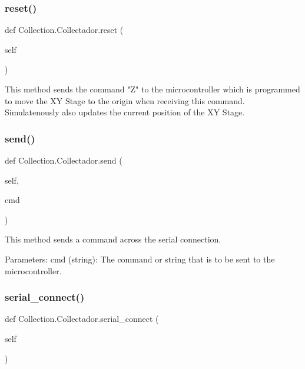 \subsubsection{\texorpdfstring{reset()}{reset()}}
{\footnotesize\ttfamily def Collection.\+Collectador.\+reset (\begin{DoxyParamCaption}\item[{}]{self }\end{DoxyParamCaption})}

\begin{DoxyVerb}This method sends the command "Z" to the microcontroller which is programmed to move the XY Stage to the origin when receiving this command.
Simulatenously also updates the current position of the XY Stage.
\end{DoxyVerb}
 \mbox{\label{class_collection_1_1_collectador_a06c63ef23395dbbc8975e407500ed593}} 
\subsubsection{\texorpdfstring{send()}{send()}}
{\footnotesize\ttfamily def Collection.\+Collectador.\+send (\begin{DoxyParamCaption}\item[{}]{self,  }\item[{}]{cmd }\end{DoxyParamCaption})}

\begin{DoxyVerb}This method sends a command across the serial connection.

Parameters:
    cmd (string): The command or string that is to be sent to the microcontroller.
\end{DoxyVerb}
 \mbox{\label{class_collection_1_1_collectador_a3d72795fd989947bee15cdd66f277815}} 
\subsubsection{\texorpdfstring{serial\_connect()}{serial\_connect()}}
{\footnotesize\ttfamily def Collection.\+Collectador.\+serial\+\_\+connect (\begin{DoxyParamCaption}\item[{}]{self }\end{DoxyParamCaption})}


